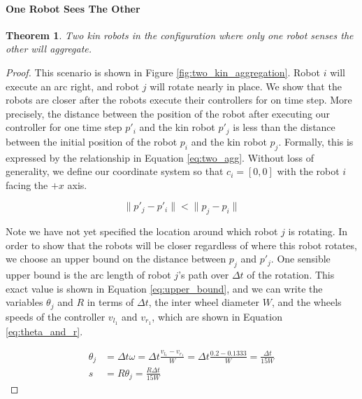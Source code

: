 \documentclass[conference]{IEEEtran}
\newtheorem{theorem}{Theorem}
\begin{document}
    \paragraph{One Robot Sees The Other}
    \begin{theorem}
      Two kin robots in the configuration where only one robot senses the other will aggregate.
    \end{theorem}
    \begin{proof}

    This scenario is shown in Figure \ref{fig:two_kin_aggregation}. Robot $i$ will execute an arc right, and robot $j$ will rotate nearly in place. We show that the robots are closer after the robots execute their controllers for on time step. More precisely, the distance between the position of the robot after executing our controller for one time step $p'_i$ and the kin robot $p'_j$ is less than the distance between the initial position of the robot $p_i$ and the kin robot $p_j$. Formally, this is expressed by the relationship in Equation \eqref{eq:two_agg}. Without loss of generality, we define our coordinate system so that $c_i=[0,0]$ with the robot $i$ facing the $+x$ axis.

    \begin{equation} \label{eq:two_agg}
      \lVert p'_j - p'_i \rVert < \lVert p_j - p_i \rVert
    \end{equation}

    Note we have not yet specified the location around which robot $j$ is rotating. In order to show that the robots will be closer regardless of where this robot rotates, we choose an upper bound on the distance between $p_j$ and $p'_j$. One sensible upper bound is the arc length of robot $j$'s path over $\Delta t$ of the rotation. This exact value is shown in Equation \eqref{eq:upper_bound}, and we can write the variables $\theta_j$ and $R$ in terms of $\Delta t$, the inter wheel diameter $W$, and the wheels speeds of the controller $v_{l_1}$ and $v_{r_1}$, which are shown in Equation \eqref{eq:theta_and_r}.

    \begin{equation} \label{eq:upper_bound}
      \begin{split}
      \theta_j &= \Delta t\omega = \Delta t \frac{v_{l_1} - v_{r_1}}{W} = \Delta t \frac{0.2 - 0.1333}{W} = \frac{\Delta t}{15W} \\
        s &= R\theta_j = \frac{R\Delta t}{15W}
      \end{split}
    \end{equation}


\end{proof}
\end{document}
